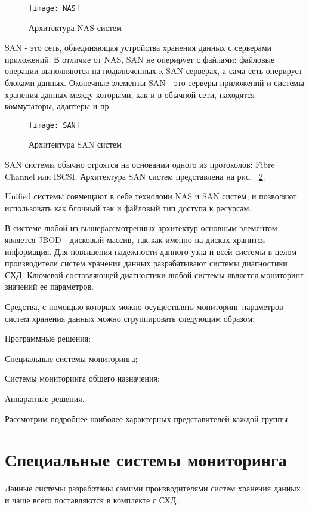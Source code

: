 \begin{figure}[!h]
	\centering
	\texttt{[image: NAS]}
	\caption{Архитектура NAS систем}
	\label{fig:NAS}
\end{figure}
  
SAN - это сеть, объединяющая устройства хранения данных с серверами приложений. В отличие от NAS, SAN не оперирует с файлами: файловые операции выполняются на подключенных к SAN серверах, а сама сеть оперирует блоками данных. Оконечные элементы SAN - это серверы приложений и системы хранения данных между которыми, как и в обычной сети, находятся коммутаторы, адаптеры и пр.

\begin{figure}[!h]
	\centering
	\texttt{[image: SAN]}
	\caption{Архитектура SAN систем}
	\label{fig:SAN}
\end{figure}

SAN системы обычно строятся на основании одного из протоколов: Fibre Channel или ISCSI. Архитектура SAN систем представлена на рис. ~\ref{fig:SAN}.

Unified системы совмещают в себе технолоии NAS и SAN систем, и позволяют использовать как блочный так и файловый тип доступа к ресурсам. 

В системе любой из вышерассмотренных архитектур основным элементом является JBOD - дисковый массив, так как именно на дисках хранится информация. Для повышения надежности данного узла и всей системы в целом производители систем хранения данных разрабатывают системы диагностики СХД. Ключевой составляющей диагностики любой системы является мониторинг значений ее параметров. 

Средства, с помощью которых можно осуществлять мониторинг параметров систем хранения данных можно сгруппировать следующим образом:
\begin{itemize*}
	\item{Программные решения:}
	\begin{itemize*}
		\item{Специальные системы мониторинга;}
		\item{Системы мониторинга общего назначения;}
	\end{itemize*}
	\item{Аппаратные решения.}
\end{itemize*}

Рассмотрим подробнее наиболее характерных представителей каждой группы.
 
\section{Специальные системы мониторинга}
Данные системы разработаны самими  производителями систем хранения данных и чаще всего поставляются в комплекте с СХД.

